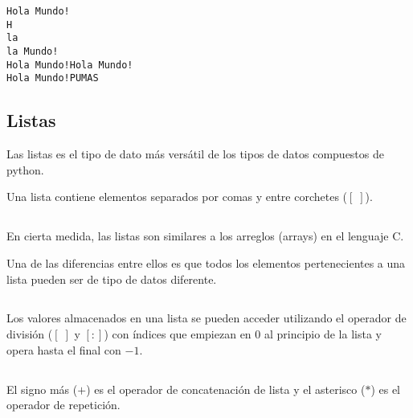 \documentclass[]{article}
\begin{document}
\begin{verbatim}
Hola Mundo!
H
la 
la Mundo!
Hola Mundo!Hola Mundo!
Hola Mundo!PUMAS
\end{verbatim}

\subsection{Listas}\label{listas}

Las listas es el tipo de dato más versátil de los tipos de datos
compuestos de python.

Una lista contiene elementos separados por comas y entre corchetes
(\([ \; ]\)).

\subsection{}\label{section-27}

En cierta medida, las listas son similares a los arreglos (arrays) en el
lenguaje C.

Una de las diferencias entre ellos es que todos los elementos
pertenecientes a una lista pueden ser de tipo de datos diferente.

\subsection{}\label{section-28}

Los valores almacenados en una lista se pueden acceder utilizando el
operador de división (\([ \; ]\) y \([:]\)) con índices que empiezan en
\(0\) al principio de la lista y opera hasta el final con \(-1\).

\subsection{}\label{section-29}

El signo más (\(+\)) es el operador de concatenación de lista y el
asterisco (\(*\)) es el operador de repetición.

\subsection{}\label{section-30}
\end{document}

